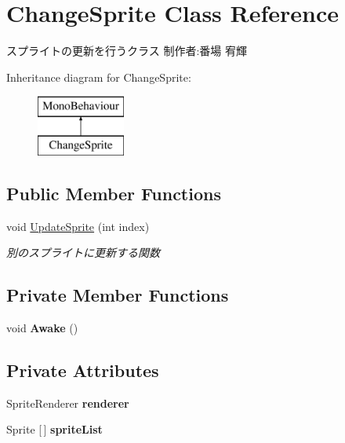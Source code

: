 \hypertarget{class_change_sprite}{}\section{Change\+Sprite Class Reference}
\label{class_change_sprite}


スプライトの更新を行うクラス 制作者\+:番場 宥輝  


Inheritance diagram for Change\+Sprite\+:\begin{figure}[H]
\begin{center}
\leavevmode
\includegraphics[height=2.000000cm]{class_change_sprite}
\end{center}
\end{figure}
\subsection*{Public Member Functions}
\begin{DoxyCompactItemize}
\item 
void \hyperlink{class_change_sprite_a0a8b79dab7e5c72e511b9c0c79103229}{Update\+Sprite} (int index)
\begin{DoxyCompactList}\small\item\em 別のスプライトに更新する関数 \end{DoxyCompactList}\end{DoxyCompactItemize}
\subsection*{Private Member Functions}
\begin{DoxyCompactItemize}
\item 
\mbox{\label{class_change_sprite_aa46797249b4630ecf2cd23564a9653d7}} 
void {\bfseries Awake} ()
\end{DoxyCompactItemize}
\subsection*{Private Attributes}
\begin{DoxyCompactItemize}
\item 
\mbox{\label{class_change_sprite_acbdfa8d86275941dd8d3a596a3c985f0}} 
Sprite\+Renderer {\bfseries renderer}
\item 
\mbox{\label{class_change_sprite_a69721e0932d60ce47441f465ed75590d}} 
Sprite \mbox{[}$\,$\mbox{]} {\bfseries sprite\+List}
\end{DoxyCompactItemize}


